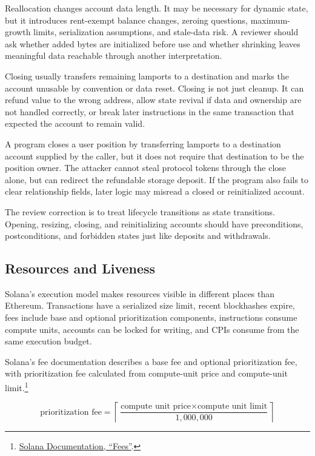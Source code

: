 Reallocation changes account data length. It may be necessary for dynamic state, but it introduces rent-exempt balance changes, zeroing questions, maximum-growth limits, serialization assumptions, and stale-data risk. A reviewer should ask whether added bytes are initialized before use and whether shrinking leaves meaningful data reachable through another interpretation.

Closing usually transfers remaining lamports to a destination and marks the account unusable by convention or data reset. Closing is not just cleanup. It can refund value to the wrong address, allow state revival if data and ownership are not handled correctly, or break later instructions in the same transaction that expected the account to remain valid.

\begin{failuremodebox}
A program closes a user position by transferring lamports to a destination account supplied by the caller, but it does not require that destination to be the position owner. The attacker cannot steal protocol tokens through the close alone, but can redirect the refundable storage deposit. If the program also fails to clear relationship fields, later logic may misread a closed or reinitialized account.
\end{failuremodebox}

The review correction is to treat lifecycle transitions as state transitions. Opening, resizing, closing, and reinitializing accounts should have preconditions, postconditions, and forbidden states just like deposits and withdrawals.

\subsection{Resources and Liveness}

Solana's execution model makes resources visible in different places than Ethereum. Transactions have a serialized size limit, recent blockhashes expire, fees include base and optional prioritization components, instructions consume compute units, accounts can be locked for writing, and CPIs consume from the same execution budget.

Solana's fee documentation describes a base fee and optional prioritization fee, with prioritization fee calculated from compute-unit price and compute-unit limit.\footnote{\href{https://solana.com/docs/core/fees}{Solana Documentation, ``Fees''}.}

\[
\text{prioritization fee}
= \left\lceil
\frac{\text{compute unit price} \times \text{compute unit limit}}{1{,}000{,}000}
\right\rceil
\]

